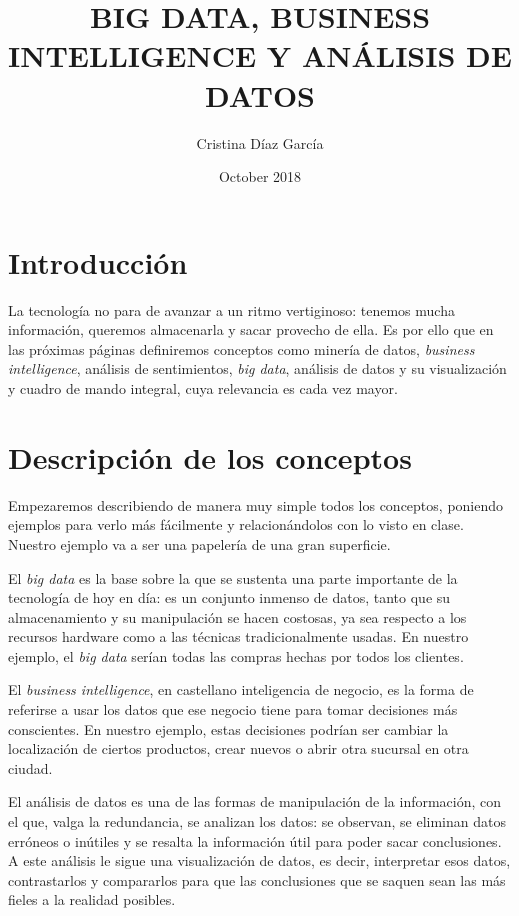 \documentclass{article}
\title{BIG DATA, BUSINESS INTELLIGENCE Y ANÁLISIS DE DATOS}
\author{Cristina Díaz García}
\date{October 2018}
\begin{document}

\begin{titlingpage}
\maketitle
\end{titlingpage}

\newpage

\tableofcontents

\newpage

\section{Introducción}
La tecnología no para de avanzar a un ritmo vertiginoso: tenemos mucha información, queremos almacenarla y sacar provecho de ella. Es por ello que en las próximas páginas definiremos conceptos como minería de datos, \textit{business intelligence}, análisis de sentimientos, \textit{big data}, análisis de datos y su visualización y cuadro de mando integral, cuya relevancia es cada vez mayor.

\section{Descripción de los conceptos}
Empezaremos describiendo de manera muy simple todos los conceptos, poniendo ejemplos para verlo más fácilmente y relacionándolos con lo visto en clase. Nuestro ejemplo va a ser una papelería de una gran superficie.

El \textit{big data} es la base sobre la que se sustenta una parte importante de la tecnología de hoy en día: es un conjunto inmenso de datos, tanto que su almacenamiento y su manipulación se hacen costosas, ya sea respecto a los recursos hardware como a las técnicas tradicionalmente usadas. En nuestro ejemplo, el \textit{big data} serían todas las compras hechas por todos los clientes.

El \textit{business intelligence}, en castellano inteligencia de negocio, es la forma de referirse a usar los datos que ese negocio tiene para tomar decisiones más conscientes. En nuestro ejemplo, estas decisiones podrían ser cambiar la localización de ciertos productos, crear nuevos o abrir otra sucursal en otra ciudad. 

El análisis de datos es una de las formas de manipulación de la información, con el que, valga la redundancia, se analizan los datos: se observan, se eliminan datos erróneos o inútiles y se resalta la información útil para poder sacar conclusiones. A este análisis le sigue una visualización de datos, es decir, interpretar esos datos, contrastarlos y compararlos para que las conclusiones que se saquen sean las más fieles a la realidad posibles. 
\end{document}
